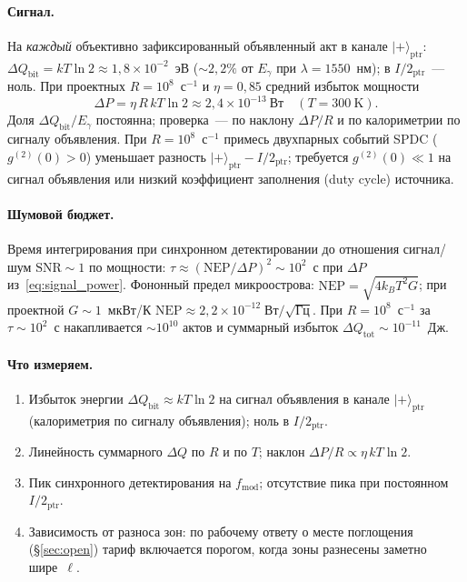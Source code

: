\documentclass[11pt,a4paper]{article}
\newcommand{\Sref}[1]{\hyperref[#1]{\S\ref{#1}}}
\begin{document}
\paragraph{Сигнал.}
На \emph{каждый} объективно зафиксированный объявленный акт в канале $|{+}\rangle_{\mathrm{ptr}}$:
$\Delta Q_{\mathrm{bit}} = kT\ln 2 \approx 1{,}8\times 10^{-2}$~эВ ($\sim 2{,}2\%$ от $E_\gamma$ при $\lambda=1550$~нм); в $I/2_{\mathrm{ptr}}$~--- ноль. При проектных $R=10^{8}$~с$^{-1}$ и $\eta=0{,}85$ средний избыток мощности
\begin{equation}
\Delta P = \eta\, R\, kT\ln 2
\approx 2{,}4\times 10^{-13}~\text{Вт}
\quad (T=300~\text{K}).
\label{eq:signal_power}
\end{equation}
Доля $\Delta Q_{\mathrm{bit}}/E_\gamma$ постоянна; проверка~--- по наклону $\Delta P/R$ и по калориметрии по сигналу объявления. При $R=10^{8}$~с$^{-1}$ примесь двухпарных событий SPDC ($g^{(2)}(0)>0$) уменьшает разность $|{+}\rangle_{\mathrm{ptr}}-I/2_{\mathrm{ptr}}$; требуется $g^{(2)}(0)\ll 1$ на сигнал объявления или низкий коэффициент заполнения (duty cycle) источника.

\paragraph{Шумовой бюджет.}
Время интегрирования при синхронном детектировании до отношения сигнал/шум $\mathrm{SNR}\sim 1$ по мощности: $\tau\approx(\mathrm{NEP}/\Delta P)^2\sim 10^{2}$~с при $\Delta P$ из~\eqref{eq:signal_power}. Фононный предел микроострова: $\mathrm{NEP}=\sqrt{4k_BT^2G}$; при проектной $G\sim 1$~мкВт/К $\mathrm{NEP}\approx 2{,}2\times 10^{-12}\;\textrm{Вт}/\sqrt{\textrm{Гц}}$. При $R=10^{8}$~с$^{-1}$ за $\tau\sim 10^{2}$~с накапливается $\sim 10^{10}$ актов и суммарный избыток $\Delta Q_{\mathrm{tot}}\sim 10^{-11}$~Дж.

\paragraph{Что измеряем.}
\begin{enumerate}
\item Избыток энергии $\Delta Q_{\mathrm{bit}} \approx kT\ln 2$ на сигнал объявления в канале $|{+}\rangle_{\mathrm{ptr}}$ (калориметрия по сигналу объявления); ноль в $I/2_{\mathrm{ptr}}$.
\item Линейность суммарного $\Delta Q$ по $R$ и по $T$; наклон $\Delta P/R \propto \eta\,kT\ln 2$.
\item Пик синхронного детектирования на $f_{\mathrm{mod}}$; отсутствие пика при постоянном $I/2_{\mathrm{ptr}}$.
\item Зависимость от разноса зон: по рабочему ответу о месте поглощения (\Sref{sec:open}) тариф включается порогом, когда зоны разнесены заметно шире~$\ell$.
\end{enumerate}
\end{document}
